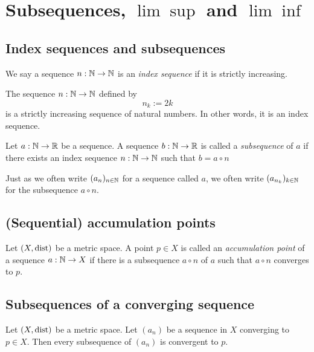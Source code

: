 \section{Subsequences, $\lim\sup$ and $\lim\inf$}

\subsection{Index sequences and subsequences}
\begin{definition}
    We say a sequence $n: \mathbb{N} \to \mathbb{N}$ is an \emph{index sequence} if it is strictly increasing.
\end{definition}
\begin{example}
    The sequence $n: \mathbb{N} \to \mathbb{N}$ defined by
    $$n_k := 2k$$
    is a strictly increasing sequence of natural numbers. In other words, it is an index sequence.
\end{example}

\begin{definition}[Subsequence]
    Let $a: \mathbb{N} \to \mathbb{R}$ be a sequence. A sequence $b: \mathbb{N} \to \mathbb{R}$ is called a \emph{subsequence} of $a$ if there exists an index sequence $n: \mathbb{N} \to \mathbb{N}$ such that
    $b = a \circ n$
\end{definition}
Just as we often write $(a_n)_{n \in \mathbb{N}}$ for a sequence called $a$, we often write $(a_{n_k})_{k\in\mathbb{N}}$ for the subsequence $a \circ n$.

\subsection{(Sequential) accumulation points}
\begin{definition}
    Let $(X, \text{dist})$ be a metric space. A point $p \in X$ is called an \emph{accumulation point} of a sequence $a: \mathbb{N} \to X$ if there is
    a subsequence $a \circ n$ of $a$ such that $a \circ n$ converges to $p$.
\end{definition}

\subsection{Subsequences of a converging sequence}
\begin{proposition}
    Let $(X, \text{dist})$ be a metric space. Let $(a_n)$ be a sequence in $X$ converging to $p \in X$. Then every subsequence of $(a_n)$ is convergent to $p$.
\end{proposition}

